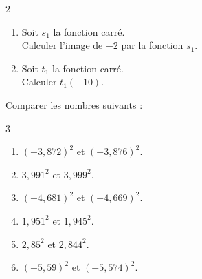 {\begin{Exercice}
\begin{multicols}{2}
\begin{enumerate}[itemsep=1em]
\begin{minipage}[t]{\linewidth}
      Calculer l'image de $-5$ par la fonction $r_1$.\end{minipage}
	\item \begin{minipage}[t]{\linewidth}Soit $s_1$ la fonction carré.\\
      
      Calculer l'image de $-2$ par la fonction $s_1$.\end{minipage}
	\item \begin{minipage}[t]{\linewidth}Soit $t_1$ la fonction carré.\\
      
      Calculer $t_1(-10)$.\end{minipage}
\end{enumerate}
\end{multicols}
\end{Exercice}

\begin{Exercice}%
Comparer les nombres suivants :
\begin{multicols}{3}
\begin{enumerate}[itemsep=1.5em]
	\item \begin{minipage}[t]{\linewidth}$(-3{,}872)^2$ et $(-3{,}876)^2$.\end{minipage}
	\item \begin{minipage}[t]{\linewidth}$3{,}991^2$ et $3{,}999^2$.\end{minipage}
	\item \begin{minipage}[t]{\linewidth}$(-4{,}681)^2$ et $(-4{,}669)^2$.\end{minipage}
	\item \begin{minipage}[t]{\linewidth}$1{,}951^2$ et $1{,}945^2$.\end{minipage}
	\item \begin{minipage}[t]{\linewidth}$2{,}85^2$ et $2{,}844^2$.\end{minipage}
	\item \begin{minipage}[t]{\linewidth}$(-5{,}59)^2$ et $(-5{,}574)^2$.\end{minipage}
\end{enumerate}
\end{multicols}
\end{Exercice}

}
